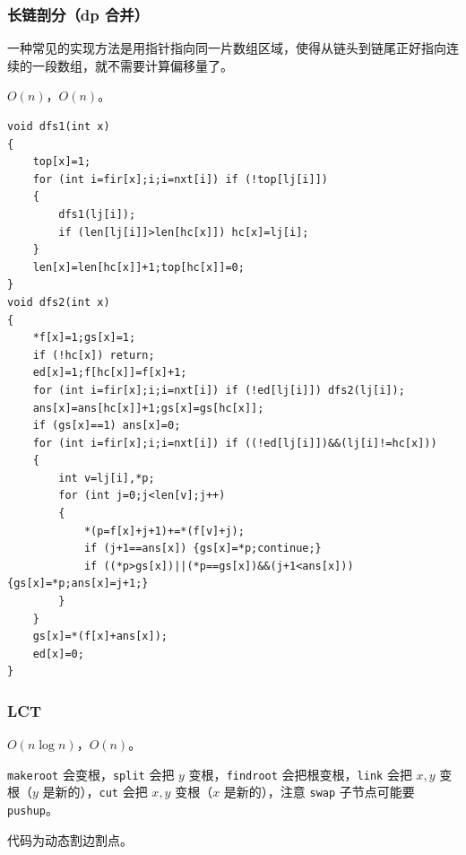 \documentclass[12pt]{ctexart}
\begin{document}
\subsubsection{长链剖分（dp 合并）}

一种常见的实现方法是用指针指向同一片数组区域，使得从链头到链尾正好指向连续的一段数组，就不需要计算偏移量了。

$O(n)$，$O(n)$。

\begin{lstlisting}
void dfs1(int x)
{
	top[x]=1;
	for (int i=fir[x];i;i=nxt[i]) if (!top[lj[i]])
	{
		dfs1(lj[i]);
		if (len[lj[i]]>len[hc[x]]) hc[x]=lj[i];
	}
	len[x]=len[hc[x]]+1;top[hc[x]]=0;
}
void dfs2(int x)
{
	*f[x]=1;gs[x]=1;
	if (!hc[x]) return;
	ed[x]=1;f[hc[x]]=f[x]+1;
	for (int i=fir[x];i;i=nxt[i]) if (!ed[lj[i]]) dfs2(lj[i]);
	ans[x]=ans[hc[x]]+1;gs[x]=gs[hc[x]];
	if (gs[x]==1) ans[x]=0;
	for (int i=fir[x];i;i=nxt[i]) if ((!ed[lj[i]])&&(lj[i]!=hc[x]))
	{
		int v=lj[i],*p;
		for (int j=0;j<len[v];j++)
		{
			*(p=f[x]+j+1)+=*(f[v]+j);
			if (j+1==ans[x]) {gs[x]=*p;continue;}
			if ((*p>gs[x])||(*p==gs[x])&&(j+1<ans[x])) {gs[x]=*p;ans[x]=j+1;}
		}
	}
	gs[x]=*(f[x]+ans[x]);
	ed[x]=0;
}
\end{lstlisting}
\subsubsection{LCT}

$O(n\log n)$，$O(n)$。

\verb|makeroot| 会变根，\verb|split| 会把 $y$ 变根，\verb|findroot| 会把根变根，\verb|link| 会把 $x,y$ 变根（$y$ 是新的），\verb|cut| 会把 $x,y$ 变根（$x$ 是新的），注意 \verb|swap| 子节点可能要 \verb|pushup|。

代码为动态割边割点。
\end{document}
